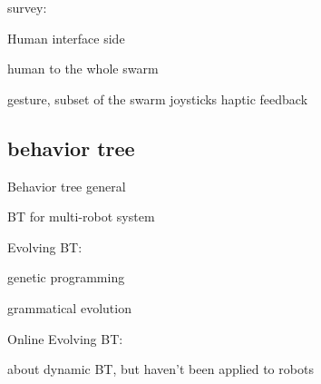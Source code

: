 survey:
\cite{siean2023opportunities}
\cite{kolling2015human}

Human interface side
\cite{jarvis2025first}
\cite{abioye2025user}
\cite{alonso2015gesture}

human to the whole swarm
\cite{ayanian2014controlling}
\cite{alonso2015gesture}
\cite{macchini2021personalized}

\cite{podevijn2013gesturing} gesture, subset of the swarm
\cite{zhou2016assistive} joysticks
\cite{lee2013semiautonomous} haptic feedback

\cite{kolling2013human}


\subsection{behavior tree}

Behavior tree general
\cite{colledanchise2018behavior}
\cite{iovino2022survey}

BT for multi-robot system
\cite{colledanchise2016advantages}
\cite{jeong2022behavior}

Evolving BT:

genetic programming
\cite{jones2018evolving}
\cite{kuckling2022automode}

grammatical evolution
\cite{neupane2019learning}
\cite{kuckling2022automode}

Online Evolving BT:

\cite{jones2019onboard}
\cite{venkata2023kt}


\cite{florez2008dynamic} about dynamic BT, but haven't been applied to robots










